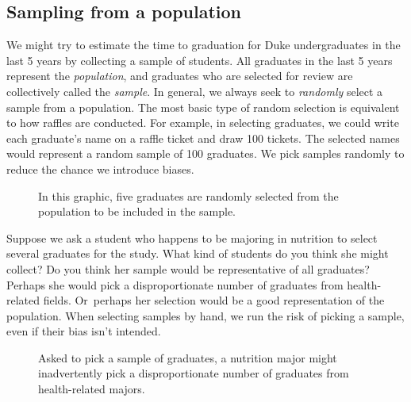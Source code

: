 \subsection{Sampling from a population}


We might try to estimate the time to graduation for Duke
undergraduates in the last 5 years by collecting a sample
of students.
All graduates in the last 5 years represent the
\emph{population}, and graduates who are
selected for review are collectively called the
\emph{sample}.
In general, we always seek to \emph{randomly} select a sample
from a population.
The most basic type of random selection is equivalent to how
raffles are conducted.
For example, in selecting graduates, we could write each
graduate's name on a raffle ticket and draw 100 tickets.
The selected names would represent a random sample of 100 graduates.
We pick samples randomly to reduce the chance we introduce biases.

\begin{figure}[ht]
  \centering
  \caption{In this graphic, five graduates are randomly
      selected from the population to be included in the
      sample.}
  \label{popToSampleGraduates}
\end{figure}

\begin{examplewrap}
\begin{nexample}{Suppose we ask a student who happens to be
    majoring in nutrition to select several graduates for
    the study.
    What kind of students do you think she might collect?
    Do you think her sample would be representative of all
    graduates?}
  Perhaps she would pick a disproportionate number of graduates
  from health-related fields.
  Or~perhaps her selection would be a good representation
  of the population.
  When selecting samples by hand, we run the risk of picking
  a  sample, even if their bias
  isn't intended.
\end{nexample}
\end{examplewrap}

\begin{figure}
  \centering
  \caption{Asked to pick a sample of graduates,
      a nutrition major might inadvertently pick a
      disproportionate number of graduates from
      health-related majors.}
  \label{popToSubSampleGraduates}
\end{figure}

